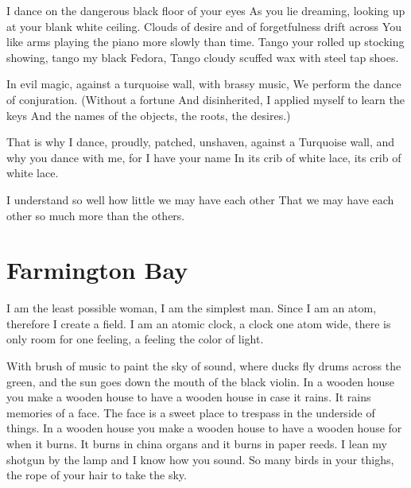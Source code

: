\documentclass[english,11pt,letterpaper,onecolumn,parskip=full]{scrbook}
\begin{document}
\begin{poem}
\begin{stanza}
I dance on the dangerous black floor of your eyes\verseline
As you lie dreaming, looking up at your blank white ceiling.\verseline
Clouds of desire and of forgetfulness drift across\verseline
You like arms playing the piano more slowly than time.\verseline
Tango your rolled up stocking showing, tango my black Fedora,\verseline
Tango cloudy scuffed wax with steel tap shoes.
\end{stanza}

\begin{stanza}
In evil magic, against a turquoise wall, with brassy music,\verseline
We perform the dance of conjuration.  (Without a fortune\verseline
And disinherited, I applied myself to learn the keys\verseline
And the names of the objects, the roots, the desires.)
\end{stanza}

\begin{stanza}
That is why I dance, proudly, patched, unshaven, against a\verseline
Turquoise wall, and why you dance with me, for I have your name\verseline
In its crib of white lace, its crib of white lace.
\end{stanza}

\begin{stanza}
I understand so well how little we may have each other\verseline
That we may have each other so much more than the others.
\end{stanza}
\end{poem}

\newpage
\section{Farmington Bay}

\begin{poem}
\begin{stanza}
I am the least possible woman, I am the simplest man.\verseline
Since I am an atom, therefore I create a field.\verseline
I am an atomic clock, a clock one atom wide, there is only room for one feeling, a feeling the color of light.
\end{stanza}

\begin{stanza}
With brush of music to paint the sky of sound, where ducks fly drums across the green, and the sun goes down the mouth of the black violin.\verseline
In a wooden house you make a wooden house to have a wooden house in case it rains.  It rains memories of a face.  The face is a sweet place to trespass in the underside of things.\verseline
In a wooden house you make a wooden house to have a wooden house for when it burns.  It burns in china organs and it burns in paper reeds.  I lean my shotgun by the lamp and I know how you sound.\verseline
So many birds in your thighs, the rope of your hair to take the sky.
\end{stanza}
\end{poem}
\end{document}
